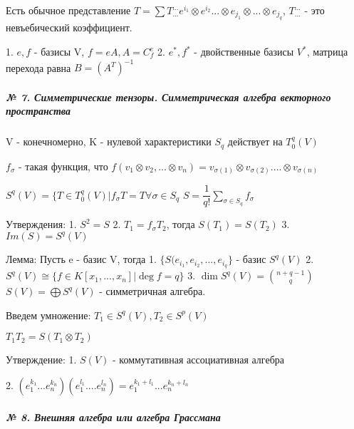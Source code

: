 \documentclass{article}
\begin{document}
\begin{flushleft}

Есть обычное представление $T = \sum{T^{...}_{...}e^{i_1} \otimes e^{i_2} ... \otimes e_{j_1} \otimes ... \otimes e_{j_q}}$, $T_{...}^{...}$ - это невъебический коэффициент.

1. $e, f$ - базисы V, $f = eA, A = C_f^e$
2. $e^*, f^*$ - двойственные базисы $V^*$, матрица перехода равна $B = (A^T)^{-1}$ 

\end{flushleft}


\subparagraph{\tiny № 7. Симметрические тензоры. Симметрическая алгебра векторного пространства}

\begin{flushleft}

V - конечномерно, K - нулевой характеристики
$S_q$ действует на $T^q_0(V)$

$f_\sigma$ - такая функция, что $f(v_1 \otimes v_2, ... \otimes v_n) = v_{\sigma(1)} \otimes v_{\sigma(2)} .... \otimes v_{\sigma(n)}$

$S^q(V) = \{T \in T^q_0(V) | f_\sigma T = T \forall \sigma \in S_q$
$S = \dfrac{1}{q!} \sum\limits_{\sigma \in S_q}{f_\sigma}$

Утверждения: 
1. $S^2 = S$
2. $T_1 = f_\sigma T_2$, тогда $S(T_1) = S(T_2)$
3. $Im(S) = S^q(V)$

Лемма:
Пусть e - базис V, тогда 
1. $\{S(e_{i_1}, e_{i_2}, ..., e_{i_q}\}$ - базис $S^q(V)$
2. $S^q(V) \cong \{f \in K[x_1, ..., x_n] | \deg{f} = q\}$
3. $\dim{S^q(V)} = {n + q - 1 \choose q}$
$S(V) = \bigoplus{S^q(V)}$ - симметричная алгебра.

Введем умножение:
$T_1 \in S^q(V), T_2 \in S^p(V)$

$T_1 T_2 = S(T_1 \otimes T_2)$

Утверждение:
1. $S(V)$ - коммутативная ассоциативная алгебра

2. $(e_1^{k_1} ... e_n^{k_n})(e_1^{l_1} .... e_n^{l_n}) = e_1^{k_1 + l_1} ... e_n^{k_n + l_n}$

\end{flushleft}

\subparagraph{\tiny № 8. Внешняя алгебра или алгебра Грассмана}
\end{document}
